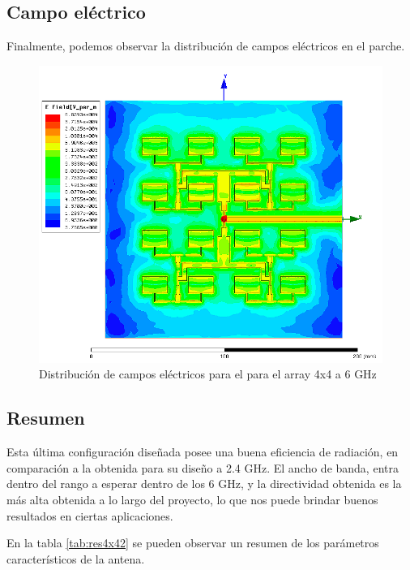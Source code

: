\subsection{Campo eléctrico}
\par Finalmente, podemos observar la distribución de campos eléctricos en el parche. 

\begin{figure}[H]
    \centering
        \includegraphics[width=\textwidth]{archivos/analisis/4x42/8}
        \caption{Distribución de campos eléctricos para el para el array 4x4 a 6 GHz}
        \label{fig:elec4x42}
\end{figure}

\subsection{Resumen}
\par Esta última configuración diseñada posee una buena eficiencia de radiación, en comparación a la obtenida para su diseño a 2.4 GHz. El ancho de banda, entra dentro del rango a esperar dentro de los 6 GHz, y la directividad obtenida es la más alta obtenida a lo largo del proyecto, lo que nos puede brindar buenos resultados en ciertas aplicaciones.
\\
\par En la tabla \ref{tab:res4x42} se pueden observar un resumen de los parámetros característicos de la antena.

